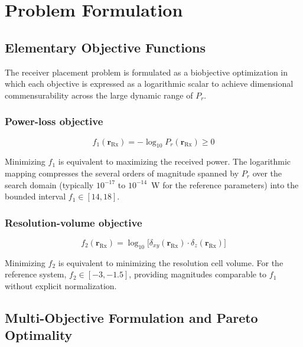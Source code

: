 \documentclass[journal]{IEEEtran}
\newcommand{\Rx}{\mathrm{Rx}}
\newcommand{\rRx}{\mathbf{r}_{\Rx}}
\newcommand{\dxy}{\delta_{xy}}
\newcommand{\dz}{\delta_z}
\begin{document}
\section{Problem Formulation}
\label{sec:problem}

\subsection{Elementary Objective Functions}

The receiver placement problem is formulated as a biobjective optimization in
which each objective is expressed as a logarithmic scalar to achieve
dimensional commensurability across the large dynamic range of $P_r$.

\subsubsection{Power-loss objective}

\begin{equation}
  f_1(\rRx) = -\log_{10} P_r(\rRx) \geq 0
  \label{eq:f1}
\end{equation}

Minimizing $f_1$ is equivalent to maximizing the received power. The
logarithmic mapping compresses the several orders of magnitude spanned by
$P_r$ over the search domain (typically $10^{-17}$ to $10^{-14}$~W for the
reference parameters) into the bounded interval $f_1 \in [14, 18]$.

\subsubsection{Resolution-volume objective}

\begin{equation}
  f_2(\rRx) = \log_{10}\!\bigl[\dxy(\rRx) \cdot \dz(\rRx)\bigr]
  \label{eq:f2}
\end{equation}

Minimizing $f_2$ is equivalent to minimizing the resolution cell volume.
For the reference system, $f_2 \in [-3, -1.5]$, providing magnitudes
comparable to $f_1$ without explicit normalization.

\subsection{Multi-Objective Formulation and Pareto Optimality}
\end{document}
